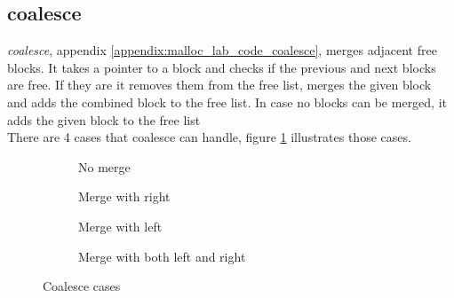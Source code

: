 \documentclass[11pt]{report}
\begin{document}
\subsection{coalesce}
\textit{coalesce}, appendix \ref{appendix:malloc_lab_code_coalesce}, merges adjacent free blocks. It takes a pointer to a block and checks if the previous and next blocks are free. If they are it removes them from the free list, merges the given block and adds the combined block to the free list. In case no blocks can be merged, it adds the given block to the free list\\[1ex]

There are 4 cases that coalesce can handle, figure \ref{fig:malloc_lab_coalesce} illustrates those cases.
\begin{figure}[h]
    \begin{subfigure}[b]{\textwidth}
        \centering
        \caption{No merge}
    \end{subfigure}
    \begin{subfigure}[b]{\textwidth}
        \centering
        \caption{Merge with right}
    \end{subfigure}
    \begin{subfigure}[b]{\textwidth}
        \centering
        \caption{Merge with left}
    \end{subfigure}
    \begin{subfigure}[b]{\textwidth}
        \centering
        \caption{Merge with both left and right}
    \end{subfigure}

    \centering
    \caption{Coalesce cases}
    \label{fig:malloc_lab_coalesce}
\end{figure}
\end{document}
